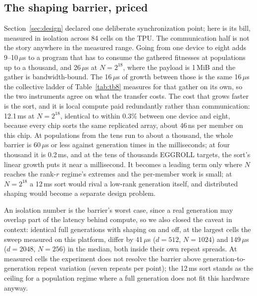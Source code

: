 \subsection{The shaping barrier, priced}
Section~\ref{sec:design} declared one deliberate synchronization point;
here is its bill, measured in isolation across 84 cells on the TPU. The
communication half is not the story anywhere in the measured range. Going
from one device to eight adds 9--10\,$\mu$s to a program that has to
consume the gathered fitnesses at populations up to a thousand, and
26\,$\mu$s at $N{=}2^{18}$, where the payload is 1\,MiB and the gather is
bandwidth-bound. The 16\,$\mu$s of growth between those is the same
16\,$\mu$s the collective ladder of Table~\ref{tab:tb8} measures for that
gather on its own, so the two instruments agree on what the transfer
costs. The cost that grows faster is
the sort, and it is local compute paid redundantly rather than
communication: 12.1\,ms at $N{=}2^{18}$, identical to within $0.3\%$
between one device and eight, because every chip sorts the same
replicated array, about 46\,ns per member on this chip. At populations
from the tens \citet{qiu2025} run to about a thousand, the
whole barrier is 60\,$\mu$s or less against generation times in the
milliseconds; at four thousand it is 0.2\,ms, and at the tens of thousands
EGGROLL targets, the sort's
linear growth puts it near a millisecond. It becomes a leading term
only where $N$ reaches the
rank-$r$ regime's extremes and the per-member work is small; at
$N{=}2^{18}$ a 12\,ms sort would rival a low-rank generation itself, and
distributed shaping would become a separate design problem.

An isolation number is the barrier's worst case, since a real generation
may overlap part of the latency behind compute, so we also closed the
caveat in context: identical full generations with shaping on and off,
at the largest cells the sweep measured on this platform, differ by
41\,$\mu$s ($d{=}512$, $N{=}1024$) and 149\,$\mu$s ($d{=}2048$,
$N{=}256$) in the median, both inside their own repeat spreads. At
measured cells the experiment does not resolve the barrier above
generation-to-generation repeat variation (seven repeats per point); the
12\,ms sort stands as the ceiling for a population
regime where a full generation does not fit this hardware anyway.

